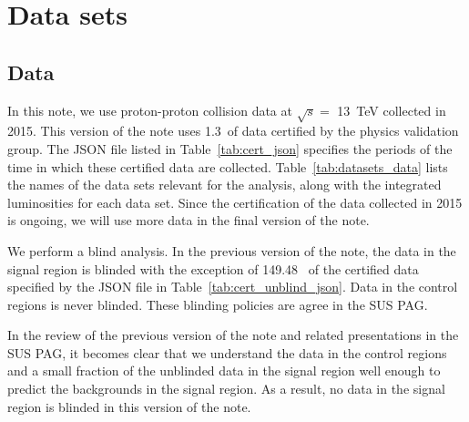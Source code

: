 \section{Data sets}
\label{sec:datasets}

\subsection{Data}


In this note, we use proton-proton collision data at $\sqrt{s} =$
13~TeV collected in 2015. This version of the note uses 1.3~\ifb of
data certified by the physics validation group. The JSON file listed
in Table~\ref{tab:cert_json} specifies the periods of the time in
which these certified data are collected.
Table~\ref{tab:datasets_data} lists the names of the data sets
relevant for the analysis, along with the integrated luminosities for
each data set. Since the certification of the data collected in 2015
is ongoing, we will use more data in the final version of the note.

We perform a blind analysis. In the previous version of the note, the
data in the signal region is blinded with the exception of 149.48~\ipb
of the certified data specified by the JSON file in
Table~\ref{tab:cert_unblind_json}. Data in the control regions is
never blinded. These blinding policies are agree in the SUS PAG.

In the review of the previous version of the note and related
presentations in the SUS PAG, it becomes clear that we understand the
data in the control regions and a small fraction of the unblinded data
in the signal region well enough to predict the backgrounds in the
signal region. As a result, no data in the signal region is blinded in
this version of the note.

\begin{table}[!h]
 \footnotesize
 \label{tab:cert_json}
\end{table}

\begin{table}[!h]
\footnotesize 
\label{tab:datasets_data}
\end{table}

\begin{table}[!h]
 \footnotesize

\label{tab:cert_unblind_json}
\end{table}

